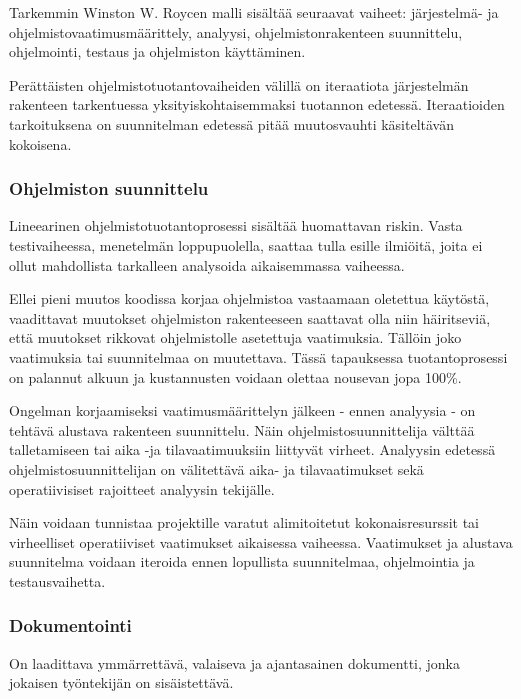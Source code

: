 \documentclass[finnish]{tktltiki2}
\theoremstyle{definition}
\theoremstyle{remark}
\begin{document}
Tarkemmin Winston W. Roycen malli sisältää seuraavat vaiheet: järjestelmä- ja ohjelmistovaatimusmäärittely, analyysi, ohjelmistonrakenteen suunnittelu, ohjelmointi, testaus ja ohjelmiston käyttäminen.\cite{ROY70} 

Perättäisten ohjelmistotuotantovaiheiden välillä on iteraatiota järjestelmän rakenteen tarkentuessa yksityiskohtaisemmaksi tuotannon edetessä. Iteraatioiden tarkoituksena on suunnitelman edetessä pitää muutosvauhti käsiteltävän kokoisena.\cite{ROY70}

\subsubsection{Ohjelmiston suunnittelu}

Lineearinen ohjelmistotuotantoprosessi sisältää huomattavan riskin. Vasta testivaiheessa, menetelmän loppupuolella, saattaa tulla esille ilmiöitä, joita ei ollut mahdollista tarkalleen analysoida aikaisemmassa vaiheessa.\cite{ROY70}

Ellei pieni muutos koodissa korjaa ohjelmistoa vastaamaan oletettua käytöstä, vaadittavat muutokset ohjelmiston rakenteeseen saattavat olla niin häiritseviä, että muutokset rikkovat ohjelmistolle asetettuja vaatimuksia. Tällöin joko vaatimuksia tai suunnitelmaa on muutettava. Tässä tapauksessa tuotantoprosessi on palannut alkuun ja kustannusten voidaan olettaa nousevan jopa 100\%.\cite{ROY70}

Ongelman korjaamiseksi vaatimusmäärittelyn jälkeen - ennen analyysia - on tehtävä alustava rakenteen suunnittelu. Näin ohjelmistosuunnittelija välttää talletamiseen tai aika -ja tilavaatimuuksiin liittyvät virheet. Analyysin edetessä ohjelmistosuunnittelijan on välitettävä aika- ja tilavaatimukset sekä operatiivisiset rajoitteet analyysin tekijälle.\cite{ROY70}

Näin voidaan tunnistaa projektille varatut alimitoitetut kokonaisresurssit tai virheelliset operatiiviset vaatimukset aikaisessa vaiheessa. Vaatimukset ja alustava suunnitelma voidaan iteroida ennen lopullista suunnitelmaa, ohjelmointia ja testausvaihetta.\cite{ROY70}

\subsubsection{Dokumentointi}

On laadittava ymmärrettävä, valaiseva ja ajantasainen dokumentti, jonka jokaisen työntekijän on sisäistettävä.\cite{ROY70}
\end{document}
